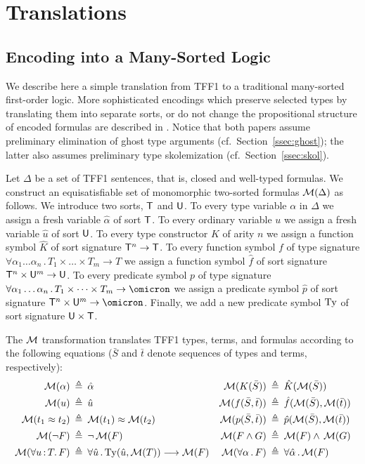 \section{Translations} \label{sec:trans}

\subsection{Encoding into a Many-Sorted Logic} \label{ssec:tff0}

We describe here a simple translation from TFF1 to a traditional
many-sorted first-order logic. More sophisticated encodings which
preserve selected types by translating them into separate sorts,
or do not change the propositional structure of encoded formulas
are described in \cite{leino10tacas,bobot11frocos}.
Notice that both papers assume preliminary elimination
of ghost type arguments (cf.~Section~\ref{ssec:ghost});
the latter also assumes preliminary type skolemization
(cf.~Section~\ref{ssec:skol}).

Let $\Delta$ be a set of TFF1 sentences, that is, closed and well-typed
formulas. We construct an equisatisfiable set of monomorphic two-sorted
formulas $\mathcal{M}(\Delta)$ as follows.
%
We introduce two sorts, $\mathsf{T}$ and $\mathsf{U}$.
To every type variable $\alpha$ in $\Delta$ we assign
a fresh variable $\hat{\alpha}$ of sort $\mathsf{T}$.
To every ordinary variable $u$ we assign
a fresh variable $\hat{u}$ of sort $\mathsf{U}$.
To every type constructor $K$ of arity $n$ we assign
a function symbol $\hat{K}$ of sort signature $\mathsf{T}^n \to \mathsf{T}$.
To every function symbol $f$ of type signature
$\forall \alpha_1\dots\alpha_n \,.\, T_1 \times \dots \times T_m \to T$
we assign a function symbol $\hat{f}$ of sort signature
$\mathsf{T}^n \times \mathsf{U}^m \to \mathsf{U}$.
To every predicate symbol $p$ of type signature
$\forall \alpha_1\dots\alpha_n \,.\, T_1 \times \dots \times T_m \to \omicron$
we assign a predicate symbol $\hat{p}$ of sort signature
$\typ^n \times \und^m \to \omicron$.
Finally, we add a new predicate symbol $\mathrm{Ty}$ of sort signature
$\mathsf{U} \times \mathsf{T}$.

The $\mathcal{M}$ transformation translates TFF1 types, terms, and formulas
according to the following equations ($\bar{S}$ and $\bar{t}$ denote
sequences of types and terms, respectively):
\begin{align*}
\mathcal{M}(\alpha) &\:\triangleq\: \hat{\alpha} &
\mathcal{M}(K(\bar{S})) &\:\triangleq\: \hat{K}(\mathcal{M}(\bar{S})) \\
\mathcal{M}(u) &\:\triangleq\: \hat{u} &
\mathcal{M}(f(\bar{S},\bar{t})) &\:\triangleq\: \hat{f}(\mathcal{M}(\bar{S}),\mathcal{M}(\bar{t})) \\
\mathcal{M}(t_1 \approx t_2) &\:\triangleq\: \mathcal{M}(t_1) \approx \mathcal{M}(t_2) &
\mathcal{M}(p(\bar{S},\bar{t})) &\:\triangleq\: \hat{p}(\mathcal{M}(\bar{S}),\mathcal{M}(\bar{t})) \\
\mathcal{M}(\lnot F) &\:\triangleq\: \lnot\, \mathcal{M}(F) &
\mathcal{M}(F \land G) &\:\triangleq\: \mathcal{M}(F) \land\, \mathcal{M}(G) \\
\mathcal{M}(\forall u \operatorname{:} T .\, F) &\:\triangleq\:
\forall \hat{u} \,.\, \mathrm{Ty}(\hat{u}, \mathcal{M}(T)) \longrightarrow \mathcal{M}(F) &
\mathcal{M}(\forall \alpha \,.\, F) &\:\triangleq\:
\forall \hat{\alpha} \,.\, \mathcal{M}(F)
\end{align*}

